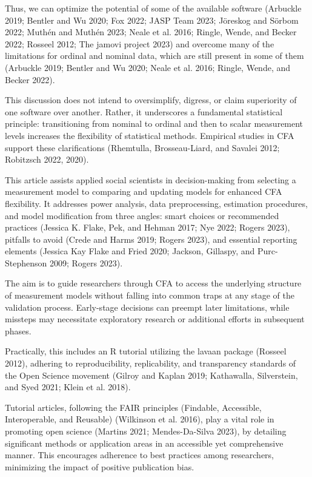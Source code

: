 \documentclass[
  a4paper,
]{article}
\begin{document}
Thus, we can optimize the potential of some of the available software
(Arbuckle 2019; Bentler and Wu 2020; Fox 2022; JASP Team 2023; Jöreskog
and Sörbom 2022; Muthén and Muthén 2023; Neale et al. 2016; Ringle,
Wende, and Becker 2022; Rosseel 2012; The jamovi project 2023) and
overcome many of the limitations for ordinal and nominal data, which are
still present in some of them (Arbuckle 2019; Bentler and Wu 2020; Neale
et al. 2016; Ringle, Wende, and Becker 2022).

This discussion does not intend to oversimplify, digress, or claim
superiority of one software over another. Rather, it underscores a
fundamental statistical principle: transitioning from nominal to ordinal
and then to scalar measurement levels increases the flexibility of
statistical methods. Empirical studies in CFA support these
clarifications (Rhemtulla, Brosseau-Liard, and Savalei 2012; Robitzsch
2022, 2020).

This article assists applied social scientists in decision-making from
selecting a measurement model to comparing and updating models for
enhanced CFA flexibility. It addresses power analysis, data
preprocessing, estimation procedures, and model modification from three
angles: smart choices or recommended practices (Jessica K. Flake, Pek,
and Hehman 2017; Nye 2022; Rogers 2023), pitfalls to avoid (Crede and
Harms 2019; Rogers 2023), and essential reporting elements (Jessica Kay
Flake and Fried 2020; Jackson, Gillaspy, and Purc-Stephenson 2009;
Rogers 2023).

The aim is to guide researchers through CFA to access the underlying
structure of measurement models without falling into common traps at any
stage of the validation process. Early-stage decisions can preempt later
limitations, while missteps may necessitate exploratory research or
additional efforts in subsequent phases.

Practically, this includes an R tutorial utilizing the lavaan package
(Rosseel 2012), adhering to reproducibility, replicability, and
transparency standards of the Open Science movement (Gilroy and Kaplan
2019; Kathawalla, Silverstein, and Syed 2021; Klein et al. 2018).

Tutorial articles, following the FAIR principles (Findable, Accessible,
Interoperable, and Reusable) (Wilkinson et al. 2016), play a vital role
in promoting open science (Martins 2021; Mendes-Da-Silva 2023), by
detailing significant methods or application areas in an accessible yet
comprehensive manner. This encourages adherence to best practices among
researchers, minimizing the impact of positive publication bias.
\end{document}
